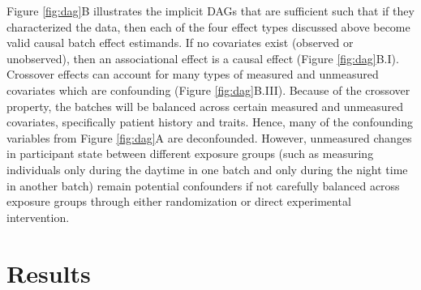 Figure \ref{fig:dag}B illustrates the implicit DAGs that are sufficient such that if they characterized the data, then each of the four effect types discussed above become valid causal batch effect estimands. 
If no covariates exist (observed or unobserved), then an associational effect is a causal effect (Figure \ref{fig:dag}B.I). 
Crossover effects can account for many types of measured and unmeasured covariates which are confounding (Figure \ref{fig:dag}B.III). Because of the crossover property, the batches will be balanced across certain measured and unmeasured covariates, specifically patient history and traits. Hence, many of the confounding variables from Figure \ref{fig:dag}A are deconfounded. However, unmeasured changes in participant state between different exposure groups (such as measuring individuals only during the daytime in one batch and only during the night time in another batch) remain potential confounders if not carefully balanced across exposure groups through either randomization or direct experimental intervention. 

\section{Results}
\label{sec:results}
